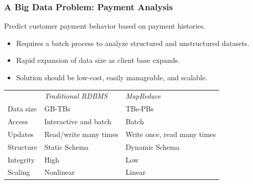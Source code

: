 \documentclass[hyperref={pdfpagelabels=false}]{beamer}
\begin{document}
\begin{frame}

\frametitle{A Big Data Problem: Payment Analysis}

Predict customer payment behavior based on payment histories.\\
\pause
\begin{itemize}
 \item Requires a batch process to analyze structured and unstructured
datasets.
\pause
 \item Rapid expansion of data size as client base expands.
\pause
 \item Solution should be low-cost, easily manageable, and scalable.\\
\pause
\end{itemize}

\begin{center}
\begin{tabular}{lll}
\rowcolor{lightBlue}
 & \textit{Traditional RDBMS} & \textit{MapReduce}\\
Data size & GB-TBs & TBs-PBs\\
Access & Interactive and batch & Batch\\
Updates & Read/write many times & Write once, read many times\\
Structure & Static Schema & Dynamic Schema\\
Integrity & High & Low\\
Scaling & Nonlinear & Linear
\end{tabular}
\end{center}


\end{frame}
\end{document}
